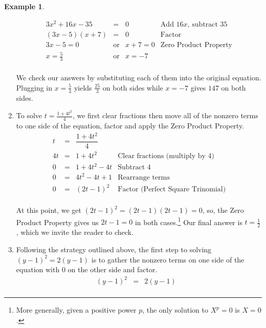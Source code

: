 \documentclass[11pt]{article}
\theoremstyle{definition}  %
\newtheorem{ex}{\bf Example}
\begin{document}
\begin{ex}
\begin{enumerate}
\[\begin{array}{rclr}
3x^2 + 16x - 35 & = & 0 & \text{Add $16x$, subtract $35$} \\

(3x-5)(x+7) & = & 0 & \text{Factor} \\

3x-5 = 0 & \text{or} & x+7 = 0 & \text{Zero Product Property} \\

x = \frac{5}{3} & \text{or} & x = -7 & \\ 

\end{array} \]

We check our answers by substituting each of them into the original equation.  Plugging in $x = \frac{5}{3}$ yields $\frac{25}{3}$ on both sides while $x = -7$ gives $147$ on both sides.

\item To solve $t = \frac{1+4t^2}{4}$, we first clear fractions then move all of the nonzero terms to one side of the equation, factor and apply the Zero Product Property.\[ \begin{array}{rclr}

t & = & \dfrac{1+4t^2}{4} & \\

4t & = & 1+4t^2 & \text{Clear fractions (multiply by $4$)} \\

0 & = & 1+4t^2 - 4t & \text{Subtract 4} \\

0 & = & 4t^2 - 4t + 1 & \text{Rearrange terms} \\

0 & = & (2t-1)^2 & \text{Factor (Perfect Square Trinomial)} \\

\end{array} \]

At this point, we get $(2t-1)^2 = (2t-1)(2t-1) = 0$, so, the Zero Product Property gives us $2t-1 =0$ in both cases.\footnote{More generally, given a positive power $p$,  the only solution to $X^p = 0$ is $X = 0$.}  Our final answer is $t = \frac{1}{2}$, which we invite the reader to check.

\item  Following the strategy outlined above, the first step to solving $(y-1)^2 = 2(y-1)$ is to gather the nonzero terms on one side of the equation with $0$ on the other side and factor.\[ \begin{array}{rclr}

(y-1)^2 & = & 2(y-1) & \\


\end{array}\]
\end{enumerate}
\end{ex}
\end{document}
